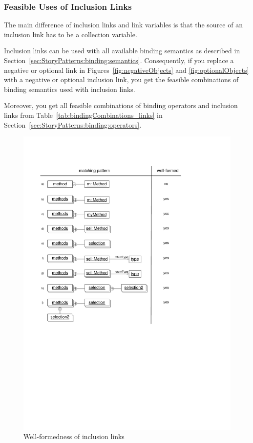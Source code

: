 \subsubsection{Feasible Uses of Inclusion Links}
\label{sec:StoryPatterns:inclusion:feasible}

The main difference of inclusion links and link variables is that the source of an inclusion link has to be a collection variable.

Inclusion links can be used with all available binding semantics as described in Section~\ref{sec:StoryPatterns:binding:semantics}.
Consequently, if you replace a negative or optional link in Figures~\ref{fig:negativeObjects} and \ref{fig:optionalObjects}
with a negative or optional inclusion link, you get the feasible combinations of binding semantics used with inclusion links.

Moreover, you get all feasible combinations of binding operators and inclusion links from
Table~\ref{tab:bindingCombinations_links} in Section~\ref{sec:StoryPatterns:binding:operators}.

\begin{figure}[htbp]
  \centering
  \includegraphics[scale=0.8]{figures/InclusionLinksWellFormedness}
  \caption{Well-formedness of inclusion links}
  \label{fig:InlucionLinkWellFormedness}
\end{figure}

